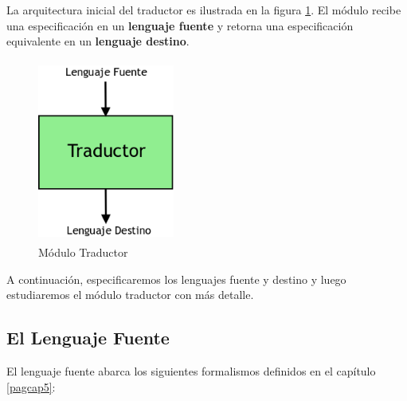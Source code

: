         La arquitectura inicial del traductor es ilustrada en
        la figura \ref{gbraun:traductor}.
        El m\'odulo recibe una especificaci\'on 
        en un {\bf lenguaje fuente} y retorna una especificaci\'on equivalente en un
        {\bf lenguaje destino}.


        \begin{figure}[h!]
	\centering
		\includegraphics[width=4.5cm,height=6cm]{traductor.png}
		\caption{M\'odulo Traductor}
		\label{gbraun:traductor}
	\end{figure}

        
        A continuaci\'on, especificaremos los lenguajes fuente y
        destino y luego estudiaremos el m\'odulo traductor con m\'as detalle.

	\subsection{El Lenguaje Fuente} \label{cap6:fuente}

        El lenguaje fuente abarca los siguientes
        formalismos definidos en el cap\'itulo \ref{pagcap5}:

